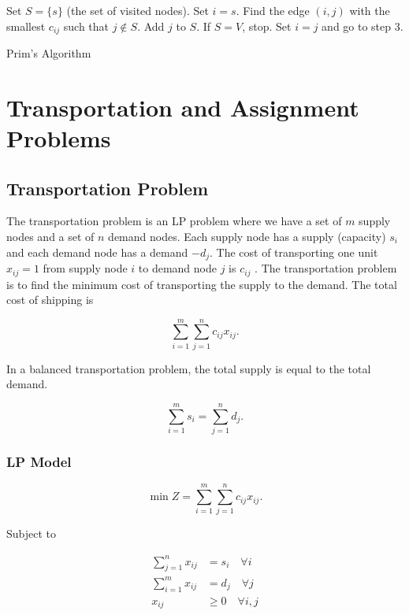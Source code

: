 \documentclass{report}
\begin{document}
\begin{enumerate}
	\ii Set $S=\{s\}$ (the set of visited nodes).
	\ii Set $i=s$.
	\ii Find the edge $(i,j)$ with the smallest $c_{ij}$ such that $j\notin S$.
	\ii Add $j$ to $S$.
	\ii If $S=V$, stop.
	\ii Set $i=j$ and go to step 3.
\end{enumerate}

\begin{algorithm}
	\SetAlgoLined
	\caption{Prim's Algorithm}
\end{algorithm}

\chapter{Transportation and Assignment Problems}

\section{Transportation Problem}

The transportation problem is an LP problem where we have a set of $m$ supply nodes and a set of $n$ demand nodes. Each supply node has a supply (capacity) $s_i$ and each demand node has a demand $-d_j$. The cost of transporting one unit $x_{ij} = 1$ from supply node $i$ to demand node $j$ is $c_{ij}$ . The transportation problem is to find the minimum cost of transporting the supply to the demand. The total cost of shipping is

\[
	\sum_{i=1}^{m}\sum_{j=1}^{n} c_{ij}x_{ij}
	.\]

In a balanced transportation problem, the total supply is equal to the total demand.

\[
	\sum_{i=1}^{m} s_i = \sum_{j=1}^{n} d_j
	.\]

\subsection{LP Model}

\[
	\min Z = \sum_{i=1}^{m}\sum_{j=1}^{n} c_{ij}x_{ij}
	.\]

Subject to

\begin{align*}
	\sum_{j=1}^{n} x_{ij} & = s_i \quad \forall i    \\
	\sum_{i=1}^{m} x_{ij} & = d_j \quad \forall j    \\
	x_{ij}                & \geq 0 \quad \forall i,j
\end{align*}
\end{document}
